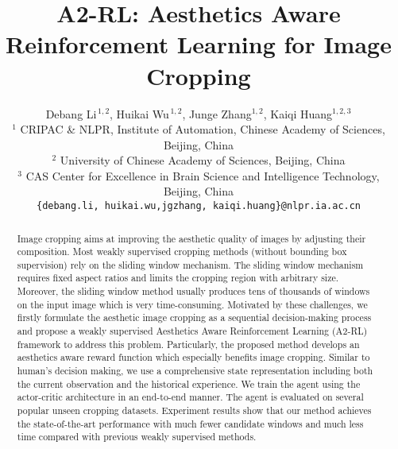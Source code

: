 \documentclass[10pt,twocolumn,letterpaper]{article}
\begin{document}
\title{A2-RL: Aesthetics Aware Reinforcement Learning for Image Cropping}

\author{Debang Li$^{\,1,2}$, Huikai Wu$^{\,1,2}$, Junge Zhang$^{1,2}$, Kaiqi Huang$^{1,2,3}$\\
$^{1}$ CRIPAC \& NLPR, Institute of Automation, Chinese Academy of Sciences, Beijing, China\\
$^{2}$ University of Chinese Academy of Sciences, Beijing, China\\
$^{3}$ CAS Center for Excellence in Brain Science and Intelligence Technology, Beijing, China\\
{\tt\small \{debang.li, huikai.wu,jgzhang, kaiqi.huang\}@nlpr.ia.ac.cn}
}

\maketitle
\thispagestyle{empty}

\begin{abstract}
Image cropping aims at improving the aesthetic quality of images by adjusting their composition. Most weakly supervised cropping methods (without bounding box supervision) rely on the sliding window mechanism. The sliding window mechanism requires fixed aspect ratios and limits the cropping region with arbitrary size. Moreover, the sliding window method usually produces tens of thousands of windows on the input image which is very time-consuming. Motivated by these challenges, we firstly formulate the aesthetic image cropping as a sequential decision-making process and propose a weakly supervised Aesthetics Aware Reinforcement Learning (A2-RL) framework to address this problem. Particularly, the proposed method develops an aesthetics aware reward function which especially benefits image cropping. Similar to human's decision making, we use a comprehensive state representation including both the current observation and the historical experience. We train the agent using the actor-critic architecture in an end-to-end manner. The agent is evaluated on several popular unseen cropping datasets. Experiment results show that our method achieves the state-of-the-art performance with much fewer candidate windows and much less time compared with previous weakly supervised methods.
\end{abstract}
\end{document}
